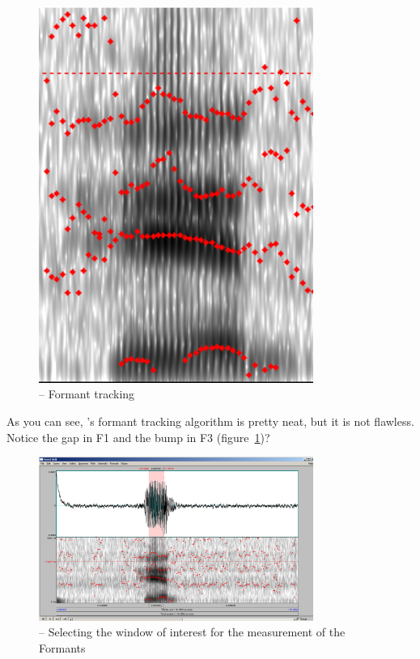 \begin{figure}[!tbp]
\caption{\Praat{} -- Formant tracking}
\label{step1measure}
	\begin{center}
		\includegraphics[width=0.8\textwidth]{./figures/PraatFormantTrack}
	\end{center}
\end{figure}

As you can see, \Praat{}'s formant tracking algorithm is pretty neat, but it is not flawless. Notice the gap in F1 and the bump in F3 (figure~\ref{step1measure})?

\begin{figure}[!tbp]
\caption{\Praat{} -- Selecting the window of interest for the measurement of the Formants}
\label{step2measure}
	\begin{center}
		\includegraphics[width=0.8\textwidth]{./figures/PraatSpectrogrSelection}
	\end{center}
\end{figure}

